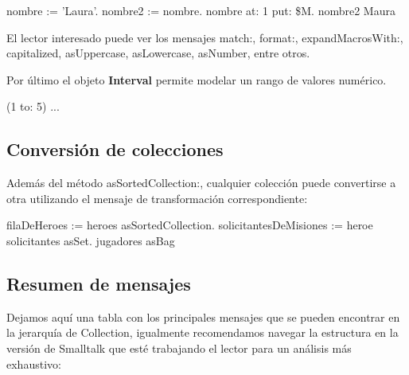 \documentclass[a4paper,12pt]{book}
\begin{document}
\begin{code}
nombre := 'Laura'.
nombre2 := nombre.
nombre at: 1 put: \$M.
nombre2
    Maura
\end{code}

El lector interesado puede ver los mensajes match:, format:, expandMacrosWith:, capitalized, asUppercase,
asLowercase, asNumber, entre otros.

Por último el objeto \textbf{Interval} permite modelar un rango de valores numérico.

\begin{code}
(1 to: 5) ...
\end{code}

\subsection{Conversión de colecciones}

Además del método asSortedCollection:, cualquier colección puede convertirse a otra utilizando el mensaje
de transformación correspondiente:

\begin{code}
filaDeHeroes := heroes asSortedCollection.
solicitantesDeMisiones := heroe solicitantes asSet.
jugadores asBag
\end{code}


\subsection{Resumen de mensajes}

Dejamos aquí una tabla con los principales mensajes que se pueden encontrar en la jerarquía de Collection,
igualmente recomendamos navegar la estructura en la versión de Smalltalk que esté trabajando el lector
para un análisis más exhaustivo:
\end{document}
